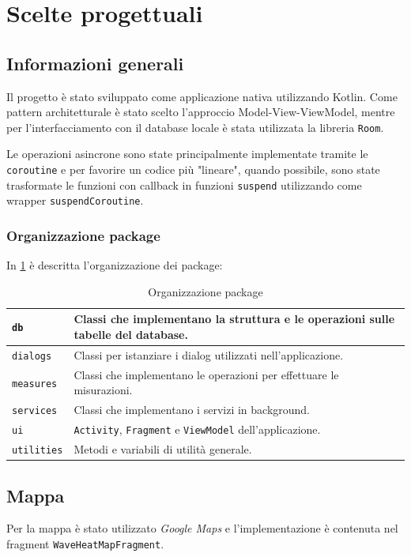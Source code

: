 \documentclass[11pt]{article}
\def\gmaps{\textit{Google Maps}}
\begin{document}
\section{Scelte progettuali}

\subsection{Informazioni generali}
Il progetto è stato sviluppato come applicazione nativa utilizzando Kotlin. 
Come pattern architetturale è stato scelto l'approccio Model-View-ViewModel, mentre per l'interfacciamento con il database locale è stata utilizzata la libreria \texttt{Room}.

Le operazioni asincrone sono state principalmente implementate tramite le \texttt{coroutine} e per favorire un codice più "lineare", quando possibile, sono state trasformate le funzioni con callback in funzioni \texttt{suspend} utilizzando come wrapper \texttt{suspendCoroutine}.

\subsubsection{Organizzazione package}
In \cref{table:packages} è descritta l'organizzazione dei package:
\begin{table}[H]
  \centering
  \begin{tabular}{ | m{8em} | m{10cm} | } 
    \hline
    \texttt{db} & Classi che implementano la struttura e le operazioni sulle tabelle del database. \\ 
    \hline
    \texttt{dialogs} & Classi per istanziare i dialog utilizzati nell'applicazione. \\ 
    \hline
    \texttt{measures} & Classi che implementano le operazioni per effettuare le misurazioni. \\ 
    \hline
    \texttt{services} & Classi che implementano i servizi in background. \\ 
    \hline
    \texttt{ui} & \texttt{Activity}, \texttt{Fragment} e \texttt{ViewModel} dell'applicazione. \\ 
    \hline
    \texttt{utilities} & Metodi e variabili di utilità generale. \\ 
    \hline
  \end{tabular}
  \caption{Organizzazione package}\label{table:packages}
\end{table}


\subsection{Mappa}
Per la mappa è stato utilizzato \gmaps{} e l'implementazione è contenuta nel fragment \texttt{WaveHeatMapFragment}.
\end{document}
